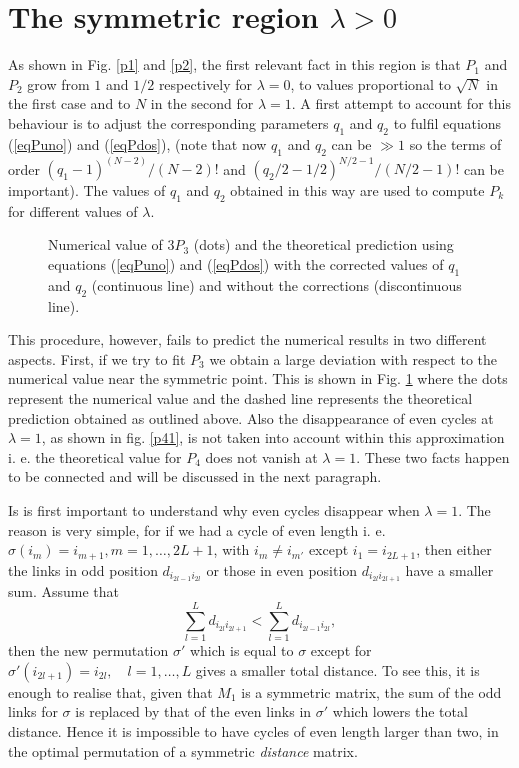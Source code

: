 \documentclass[]{iopart}
\begin{document}
\section{The symmetric region $\lambda>0$}
As shown in Fig. \ref{p1} and \ref{p2}, the first relevant 
fact in this region
is that $P_1$ and $P_2$ grow from $1$ and $1/2$ respectively 
for $\lambda=0$, to values proportional to $\sqrt{N}$ 
in the first case and to $N$ in the second for $\lambda=1$.
A first attempt to account for this behaviour
is to adjust the corresponding parameters
$q_1$ and $q_2$ to fulfil equations (\ref{eqPuno}) and 
(\ref{eqPdos}), (note that now $q_1$ and $q_2$ can be $\gg 1$ so the terms
of order $ (q_1-1)^{(N-2)}/(N-2)!$ and $(q_2/2-1/2)^{N/2-1}/(N/2-1)!$ can be important).
 The values of $q_1$ and $q_2$ obtained
in this way are used to compute $P_k$ for 
different values of $\lambda$. 

\begin{figure}[h!]
\caption{\small Numerical value of $3 P_3$ (dots) and the theoretical prediction using
 equations (\ref{eqPuno}) and 
(\ref{eqPdos}) with the corrected values of $q_1$ and $q_2$ (continuous line) and without the
 corrections (discontinuous line).}
\label{p3teo}
\end{figure}


This procedure, however, fails to predict the numerical
results in two different aspects.
First, if we try to fit $P_3$ we obtain a large deviation
with respect to the numerical value near the symmetric point.
This is shown in Fig. \ref{p3teo} where the dots represent the 
numerical value and the dashed line represents 
the theoretical prediction obtained as outlined above. 
Also the disappearance of even cycles at $\lambda=1$,
as shown in fig. \ref{p41},
is not taken into account within this approximation
i. e. the theoretical value for $P_4$ does not vanish at $\lambda=1$.
These two facts happen to be connected and will be 
discussed in the next paragraph.

Is is first important to understand why even cycles
disappear when $\lambda=1$. 
The reason is very simple, for if we had a
cycle of even length i. e.  $\sigma(i_m)=i_{m+1}, m=1,\dots,2L+1$,
with $i_{m}\not=i_{m'}$ except $i_1=i_{2L+1}$, 
then either the links in odd position
$d_{i_{2l-1}i_{2l}}$ 
or those in even position 
$d_{i_{2l}i_{2l+1}}$ 
have a smaller sum. 
Assume that
$$\sum_{l=1}^L d_{i_{2l}i_{2l+1}}< \sum_{l=1}^L d_{i_{2l-1}i_{2l}},$$
then the new permutation $\sigma'$ which is equal to $\sigma$ except
for $\sigma'(i_{2l+1})=i_{2l},\quad l=1,\dots,L$ gives a smaller
total distance. To see this, it is enough to realise that, 
given that $M_{1}$ is a symmetric matrix, the sum of the odd links 
for $\sigma$ is replaced by that of the even links in $\sigma'$
which lowers the total distance. Hence it is impossible
to have cycles of even length larger than two, in the optimal permutation
of a symmetric {\it distance} matrix.
\end{document}
